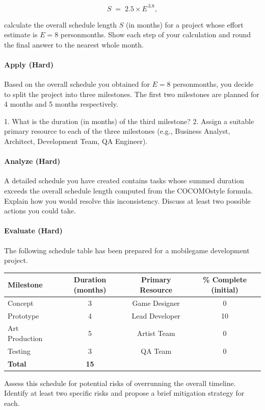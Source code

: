 \documentclass[12pt, a4paper]{article}
\begin{document}
\[
S \;=\; 2.5 \times E^{\,3.8},
\]

calculate the overall schedule length \(S\) (in months) for a project whose effort estimate is \(E = 8\) personmonths. Show each step of your calculation and round the final answer to the nearest whole month.  
\newpage

\paragraph{Apply (Hard)} Based on the overall schedule you obtained for \(E = 8\) personmonths, you decide to split the project into three milestones. The first two milestones are planned for 4 months and 5 months respectively.  

1. What is the duration (in months) of the third milestone?  
2. Assign a suitable primary resource to each of the three milestones (e.g., Business Analyst, Architect, Development Team, QA Engineer).  
\newpage

\paragraph{Analyze (Hard)} A detailed schedule you have created contains tasks whose summed duration exceeds the overall schedule length computed from the COCOMOstyle formula. Explain how you would resolve this inconsistency. Discuss at least two possible actions you could take.  
\newpage

\paragraph{Evaluate (Hard)} The following schedule table has been prepared for a mobilegame development project.  

\begin{center}
\begin{tabular}{|l|c|c|c|}
\hline
\textbf{Milestone} & \textbf{Duration (months)} & \textbf{Primary Resource} & \textbf{\% Complete (initial)} \\
\hline
Concept           & 3  & Game Designer       & 0 \\
Prototype         & 4  & Lead Developer       & 10 \\
Art Production    & 5  & Artist Team          & 0 \\
Testing           & 3  & QA Team              & 0 \\
\hline
\textbf{Total}    & \textbf{15} &                     &   \\
\hline
\end{tabular}
\end{center}

Assess this schedule for potential risks of overrunning the overall timeline. Identify at least two specific risks and propose a brief mitigation strategy for each.  
\newpage
\end{document}
